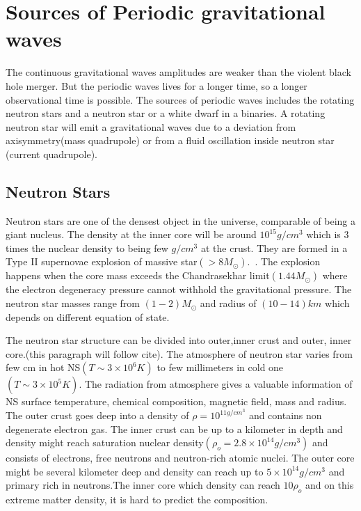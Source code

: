 \documentclass{ttuthes2007}
\begin{document}
\section{Sources of Periodic gravitational waves}
The continuous gravitational waves amplitudes are weaker than the violent black
hole merger. But the periodic waves lives for a longer time, so a longer
observational time is possible. The sources of periodic waves includes the
rotating neutron stars and a neutron star or a white dwarf in a binaries. A
rotating neutron star will emit a gravitational waves due to a deviation from
axisymmetry(mass quadrupole) or from a fluid oscillation inside neutron
star (current quadrupole). 

\subsection{Neutron Stars}

Neutron stars are one of the densest object in the universe, comparable of being
a giant nucleus. The density at the inner core will be around $10^15 g/cm^3$
which is 3 times the nuclear density to being few $g/cm^3$ at the crust. They
are formed in a Type II supernovae explosion of massive
star$(>8M_\odot)$.~\cite{Lattimer_2004}. The explosion happens when the core
mass exceeds the Chandrasekhar limit$(1.44M_\odot)$ where the electron
degeneracy pressure cannot withhold the gravitational pressure. The neutron star
masses range from $(1-2)M_\odot$ and radius of $(10-14)km$ which depends on
different equation of state. 
	
The neutron star structure can be divided into outer,inner crust and outer, inner
core.(this paragraph will follow cite). The atmosphere of neutron star varies
from few cm in hot \ac{NS}$(T\sim3\times10^6K)$ to few millimeters in cold one
$(T\sim3\times10^5K)$. The radiation from atmosphere gives a valuable
information of \ac{NS} surface temperature, chemical composition, magnetic
field, mass and radius. The outer crust goes deep into a density of
$\rho=10^{11g/cm^3}$ and contains non degenerate electron gas. The inner crust
can be up to a kilometer in depth and density might reach saturation nuclear density$(\rho_o=2.8\times10^{14}g/cm^3)$ and consists of
electrons, free neutrons and neutron-rich atomic nuclei. The outer core might be
several kilometer deep and density can reach up to $5\times10^{14}g/cm^3$ and
primary rich in neutrons.The inner core which density can reach $10\rho_o$ and
on this extreme matter density, it is hard to predict the composition. 
\end{document}
